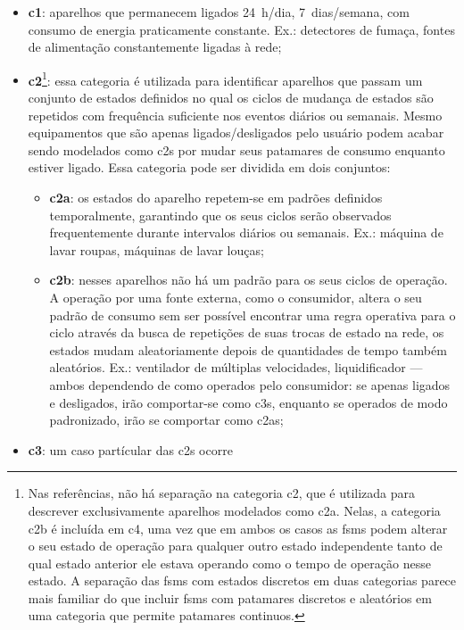 \begin{itemize}
\item \textbf{\Gls{c1}}: aparelhos que permanecem
ligados 24~h/dia, 7~dias/semana, com consumo de energia praticamente
constante. Ex.: detectores de fumaça, fontes de alimentação
constantemente ligadas à rede;
\item \textbf{\gls{c2}}\footnote{Nas referências, não há separação na
categoria \gls{c2}, que é utilizada para descrever exclusivamente
aparelhos modelados como \acrshort{c2a}. Nelas, a categoria
\acrshort{c2b} é incluída em \acrshort{c4}, uma vez que em ambos os
casos as \glspl{fsm} podem alterar o seu estado de operação para
qualquer outro estado independente tanto de qual estado anterior ele estava
operando como o tempo de operação nesse estado. A separação das
\glspl{fsm} com estados discretos em duas categorias parece mais
familiar do que incluir \glspl{fsm} com patamares discretos e
aleatórios em uma categoria que permite patamares
continuos.\label{fn:subdivisao}}: essa categoria é utilizada
para identificar aparelhos que passam um conjunto de estados definidos
no qual os ciclos de mudança de estados são repetidos com frequência
suficiente nos eventos diários ou semanais. Mesmo equipamentos que são
apenas ligados/desligados pelo usuário podem acabar sendo modelados
como \glspl{c2} por mudar seus patamares de consumo enquanto estiver
ligado. Essa categoria pode ser dividida em dois conjuntos:
\begin{itemize}
\item \textbf{\gls{c2a}}: os estados do aparelho repetem-se em
padrões definidos temporalmente, garantindo que os seus ciclos serão
observados frequentemente durante intervalos diários ou semanais. Ex.:
máquina de lavar roupas, máquinas de lavar louças;
\item \textbf{\gls{c2b}}: nesses aparelhos não há
um padrão para os seus ciclos de operação. A operação por uma fonte
externa, como o consumidor, altera o seu padrão de consumo sem ser
possível encontrar uma regra operativa para o ciclo através da busca
de repetições de suas trocas de estado na rede, os estados mudam
aleatoriamente depois de quantidades de tempo também aleatórios. Ex.:
ventilador de múltiplas velocidades, liquidificador --- ambos
dependendo de como operados pelo consumidor: se apenas ligados e
desligados, irão comportar-se como \acrshort{c3}s, enquanto se
operados de modo padronizado, irão se comportar como \acrshort{c2a}s;
\end{itemize}
\item \textbf{\gls{c3}}: um caso partícular das \glspl{c2} ocorre

\end{itemize}
